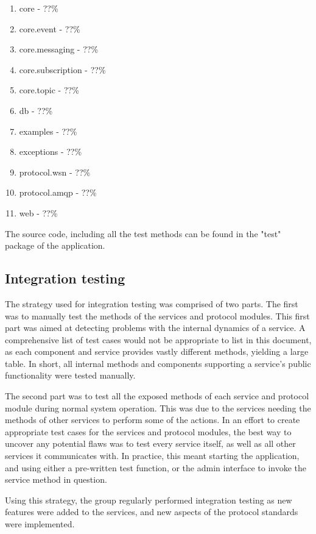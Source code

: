 \begin{enumerate}
\item core - ??\%
\item core.event - ??\%
\item core.messaging - ??\%
\item core.subscription - ??\%
\item core.topic - ??\%
\item db - ??\%
\item examples - ??\%
\item exceptions - ??\%
\item protocol.wsn - ??\%
\item protocol.amqp - ??\%
\item web - ??\%
\end{enumerate}

The source code, including all the test methods can be found in the "test" package of the application.

\subsection{Integration testing}
\label{subsec:testing-test_execution-integration_testing}

The strategy used for integration testing was comprised of two parts. The first was to manually test the methods of the services and protocol modules. This first part was aimed at detecting problems with the internal dynamics of a service. A comprehensive list of test cases would not be appropriate to list in this document, as each component and service provides vastly different methods, yielding a large table. In short, all internal methods and components supporting a service's public functionality were tested manually.

The second part was to test all the exposed methods of each service and protocol module during normal system operation. This was due to the services needing the methods of other services to perform some of the actions. In an effort to create appropriate test cases for the services and protocol modules, the best way to uncover any potential flaws was to test every service itself, as well as all other services it communicates with. In practice, this meant starting the application, and using either a pre-written test function, or the admin interface to invoke the service method in question.

Using this strategy, the group regularly performed integration testing as new features were added to the services, and new aspects of the protocol standards were implemented.

